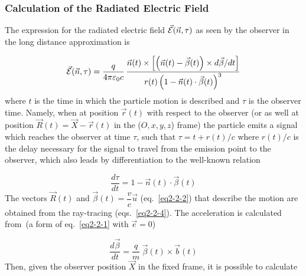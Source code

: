 \subsubsection{Calculation of the Radiated  Electric Field  \label{secN4.1}}


\noindent The expression for  the radiated  electric field $\vec {\mathcal{E}} (\vec{n}, \tau)$ 
as seen by the observer in the long
distance approximation is~\cite{Albert} 

\begin{equation}
\vec \Ecal (\vec{n}, \tau) = 
	\dfrac{q}{4\pi\varepsilon_0c}\, 
	\dfrac{\vec{n}(t) \times \left[
		\left(\vec{n}(t)- \vec{\beta}(t) \right) 
		\times d\vec{\beta}/dt \right]}%
	{r(t) \left(1 - \vec{n}(t)\cdot\vec{\beta}(t) \right)^3}
 \label{eqN4.1}
\end{equation}
%
where $t$ is the time in which the particle motion is described and $\tau$ is the
observer time. Namely, when at position $\vec{r}(t)$ with respect to the observer (or as
well at position $\vec{R}(t) = \vec{X} - \vec{r}(t)$ in the ($O, x, y, z$) frame) the
particle emits a signal which reaches the observer at time $\tau$, such that $\tau = t +
r(t)/c$ where  $r(t)/c$ is the delay necessary for the signal to travel from the
emission point to the observer, which also leads by differentiation to the well-known
 relation

\begin{equation}
\dfrac{d\tau}{dt} = 1 - \vec{n}(t) \cdot \vec{\beta}(t)  \label{eqN4.2}
\end{equation} 
%
\noindent The vectors $\vec{R}(t)$ and $\vec{\beta}(t) = \dfrac{v}{c} \vec u$ (eq.~\ref{eq2-2-2}) that describe the motion are obtained from the ray-tracing (eqs.~\ref{eq2-2-4}). The acceleration is calculated  from~(a form of eq.~\ref{eq2-2-1} with $\vec e=0$)

\begin{equation}
\dfrac{d\vec{\beta}}{dt} = \dfrac{q}{m}~\vec{\beta}(t) \times \vec{b}(t) \label{eqN4.3}
\end{equation} %
%
\noindent Then, given the observer position $\vec{X}$ in the fixed frame, it is possible to calculate

